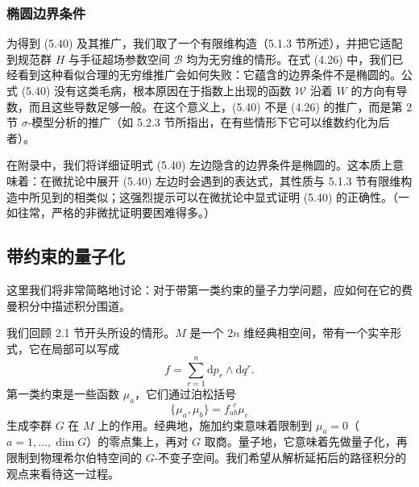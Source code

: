 \documentclass[11pt,a4paper,UTF8]{ctexart}
\theoremstyle{plain}
\theoremstyle{definition}
\begin{document}

\subsubsection{椭圆边界条件}

为得到 (5.40) 及其推广，我们取了一个有限维构造（5.1.3 节所述），并把它适配到规范群 $H$ 与手征超场参数空间 $\mathcal{B}$ 均为无穷维的情形。在式 (4.26) 中，我们已经看到这种看似合理的无穷维推广会如何失败：它蕴含的边界条件不是椭圆的。公式 (5.40) 没有这类毛病，根本原因在于指数上出现的函数 $\mathcal{W}$ 沿着 $W$ 的方向有导数，而且这些导数足够一般。在这个意义上，(5.40) 不是 (4.26) 的推广，而是第 2 节 $\sigma$-模型分析的推广（如 5.2.3 节所指出，在有些情形下它可以维数约化为后者）。

在附录中，我们将详细证明式 (5.40) 左边隐含的边界条件是椭圆的。这本质上意味着：在微扰论中展开 (5.40) 左边时会遇到的表达式，其性质与 5.1.3 节有限维构造中所见到的相类似；这强烈提示可以在微扰论中显式证明 (5.40) 的正确性。（一如往常，严格的非微扰证明要困难得多。）


\subsection{带约束的量子化}

这里我们将非常简略地讨论：对于带第一类约束的量子力学问题，应如何在它的费曼积分中描述积分围道。

我们回顾 2.1 节开头所设的情形。$M$ 是一个 $2n$ 维经典相空间，带有一个实辛形式，它在局部可以写成
\begin{equation}
    f=\sum_{r=1}^{n}\mathrm{d}p_r\wedge\mathrm{d}q^r .
    \tag{5.45}
\end{equation}
第一类约束是一些函数 $\mu_a$，它们通过泊松括号
\begin{equation}
    \{\mu_a,\mu_b\}=f_{ab}^{\ \ c}\mu_c
    \tag{5.46}
\end{equation}
生成李群 $G$ 在 $M$ 上的作用。经典地，施加约束意味着限制到 $\mu_a=0$（$a=1,\dots,\dim G$）的零点集上，再对 $G$ 取商。量子地，它意味着先做量子化，再限制到物理希尔伯特空间的 $G$-不变子空间。我们希望从解析延拓后的路径积分的观点来看待这一过程。
\end{document}
